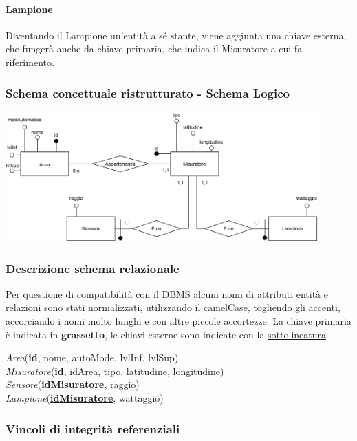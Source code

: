 \paragraph{Lampione} Diventando il Lampione un'entità a sé stante, viene aggiunta una chiave esterna, che fungerà anche da chiave primaria, che indica il Misuratore a cui fa riferimento.

\subsubsection{Schema concettuale ristrutturato - Schema Logico}

\begin{center}
    \includegraphics[width=12cm]{contenuti/specifica-basi-dati/img-sbd/anagrafica_logico.png}
\end{center}

\subsubsection{Descrizione schema relazionale}

Per questione di compatibilità con il DBMS alcuni nomi di attributi entità e relazioni sono stati normalizzati, utilizzando il camelCase, togliendo gli accenti, accorciando i nomi molto lunghi e con altre piccole accortezze.
La chiave primaria è indicata in \textbf{grassetto}, le chiavi esterne sono indicate con la \underline{sottolineatura}.

\textit{Area}(\textbf{id}, nome, autoMode, lvlInf, lvlSup) \\
\textit{Misuratore}(\textbf{id}, \underline{idArea}, tipo, latitudine, longitudine) \\
\textit{Sensore}(\underline{\textbf{idMisuratore}}, raggio) \\
\textit{Lampione}(\underline{\textbf{idMisuratore}}, wattaggio)

\subsubsection{Vincoli di integrità referenziali}

